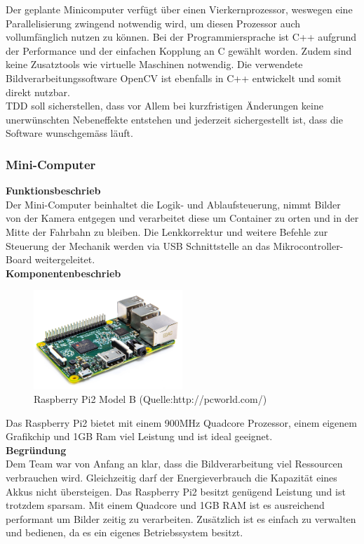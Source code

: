 Der geplante Minicomputer verfügt über einen Vierkernprozessor, weswegen eine Parallelisierung zwingend notwendig wird, um diesen Prozessor auch vollumfänglich nutzen zu können. Bei der Programmiersprache ist C++ aufgrund der Performance und der einfachen Kopplung an C gewählt worden. Zudem sind keine Zusatztools wie virtuelle Maschinen notwendig. Die verwendete Bildverarbeitungssoftware OpenCV ist ebenfalls in C++ entwickelt und somit direkt nutzbar.\\
TDD soll sicherstellen, dass vor Allem bei kurzfristigen Änderungen keine unerwünschten Nebeneffekte entstehen und jederzeit sichergestellt ist, dass die Software wunschgemäss läuft.\\[0.2cm]

\subsubsection{Mini-Computer}
\textbf{Funktionsbeschrieb}\\[0.2cm]
Der Mini-Computer beinhaltet die Logik- und Ablaufsteuerung, nimmt Bilder von der Kamera entgegen und verarbeitet diese um Container zu orten und in der Mitte der Fahrbahn zu bleiben. Die Lenkkorrektur und weitere Befehle zur Steuerung der Mechanik werden via USB Schnittstelle an das Mikrocontroller-Board weitergeleitet.\\[0.2cm]
\textbf{Komponentenbeschrieb}\\[0.2cm]
\begin{figure}[H]
	\centering
	\includegraphics[width=0.5\textwidth]{03_Loesungskonzept/pictures/raspberrypi2.png}
	\caption{Raspberry Pi2 Model B (Quelle:http://pcworld.com/)}
\end{figure}\flushleft
Das Raspberry Pi2 bietet mit einem 900MHz Quadcore Prozessor, einem eigenem Grafikchip und 1GB Ram viel Leistung und ist ideal geeignet.\\[0.2cm]
\textbf{Begründung}\\[0.2cm]
Dem Team war von Anfang an klar, dass die Bildverarbeitung viel Ressourcen verbrauchen wird. Gleichzeitig darf der Energieverbrauch die Kapazität eines Akkus nicht übersteigen. Das Raspberry Pi2 besitzt genügend Leistung und ist trotzdem sparsam. Mit einem Quadcore und 1GB RAM ist es ausreichend performant um Bilder zeitig zu verarbeiten. Zusätzlich ist es einfach zu verwalten und bedienen, da es ein eigenes Betriebssystem besitzt.\\[0.2cm]

